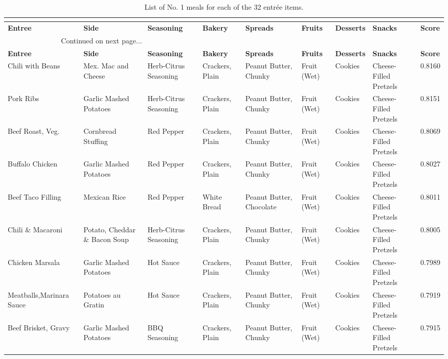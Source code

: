 \begin{landscape}
\footnotesize
\begin{longtable}{p{3.0cm}p{3.7cm}p{2.2cm}p{2.0cm}p{2.3cm}p{0.8cm}p{1.5cm}p{2.2cm}p{0.8cm}}
\caption{List of No. 1 meals for each of the 32 entr\'{e}e items.  } \\
\label{tab:mremeals} \\
\endfirsthead
\midrule
{\bf Entree} & {\bf Side} & {\bf Seasoning} & {\bf Bakery} & {\bf Spreads} & {\bf Fruits} & {\bf Desserts} & {\bf Snacks} & {\bf Score}\\
\midrule
\endhead
 \multicolumn{3}{c}{Continued on next page...} \\
\endfoot
\bottomrule
\endlastfoot
\toprule
{\bf Entree} & {\bf Side} & {\bf Seasoning} & {\bf Bakery} & {\bf Spreads} & {\bf Fruits} & {\bf Desserts} & {\bf Snacks} & {\bf Score}\\
\midrule
Chili with Beans & Mex. Mac and Cheese & Herb-Citrus Seasoning & Crackers, Plain & Peanut Butter, Chunky & Fruit (Wet) & Cookies & Cheese-Filled Pretzels & 0.8160 \\
\midrule
Pork Ribs & Garlic Mashed Potatoes & Herb-Citrus Seasoning & Crackers, Plain & Peanut Butter, Chunky & Fruit (Wet) & Cookies & Cheese-Filled Pretzels & 0.8151 \\
\midrule
Beef Roast, Veg. & Cornbread Stuffing & Red Pepper & Crackers, Plain &  Peanut Butter, Chunky & Fruit (Wet) & Cookies & Cheese-Filled Pretzels & 0.8069 \\
\midrule
Buffalo Chicken & Garlic Mashed Potatoes & Red Pepper & Crackers, Plain &  Peanut Butter, Chunky & Fruit (Wet) & Cookies & Cheese-Filled Pretzels & 0.8027 \\
\midrule
Beef Taco Filling & Mexican Rice & Red Pepper & White Bread & Peanut Butter, Chocolate & Fruit (Wet) & Cookies & Cheese-Filled Pretzels & 0.8011 \\
\midrule
Chili \& Macaroni & Potato, Cheddar \& Bacon Soup & Herb-Citrus Seasoning & Crackers, Plain & Peanut Butter, Chunky & Fruit (Wet) & Cookies & Cheese-Filled Pretzels & 0.8005 \\
\midrule
Chicken Marsala & Garlic Mashed Potatoes & Hot Sauce & Crackers, Plain & Peanut Butter, Chunky & Fruit (Wet) & Cookies & Cheese-Filled Pretzels & 0.7989 \\
\midrule
Meatballs,Marinara Sauce & Potatoes au Gratin & Hot Sauce & Crackers, Plain & Peanut Butter, Chunky & Fruit (Wet) & Cookies & Cheese-Filled Pretzels & 0.7919 \\
\midrule
Beef Brisket, Gravy & Garlic Mashed Potatoes & BBQ Seasoning & Crackers, Plain & Peanut Butter, Chunky & Fruit (Wet) & Cookies & Cheese-Filled Pretzels & 0.7915 \\

\end{longtable}
\end{landscape}
